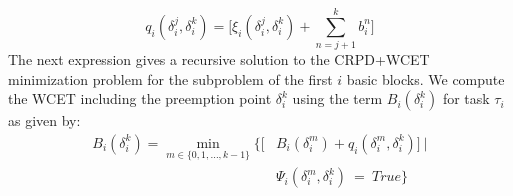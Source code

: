 \begin{equation}\label{eqn:mthnpr-time}
   q_{i}(\delta_{i}^{j},\delta_{i}^{k}) = \Big[\xi_{i}(\delta_{i}^{j},\delta_{i}^{k}) + \sum_{n=j+1}^{k}b_{i}^{n}\Big]
\end{equation}
\noindent
The next expression gives a recursive solution to the CRPD+WCET minimization problem for the subproblem of the first $i$ basic blocks.  We compute the WCET including the preemption point $\delta_i^k$ using the term \begin{math}B_{i}(\delta_{i}^{k})\end{math} for task \begin{math}\tau_{i}\end{math} as given by:
%
\begin{equation}\label{eqn:bbkwcet-cost}
\begin{split}
   B_{i}(\delta_{i}^{k}) = \min_{m \in \{0,1, \ldots, k-1\}}
   \Big\{\Big[&B_{i}(\delta_{i}^{m}) + q_{i}(\delta_{i}^{m},\delta_{i}^{k})\Big]\ |\\
   &\Psi_{i}(\delta_{i}^{m},\delta_{i}^{k})\ =\ True\Big\}
\end{split}
\end{equation}

